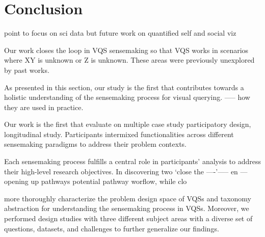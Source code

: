 \section{Conclusion\label{sec:conclusion}}
point to focus on sci data but future work on quantified self and social viz


Our work closes the loop in VQS sensemaking so that VQS works in scenarios  where XY is unknown or Z is unknown. These areas were previously unexplored by past works.

As presented in this section, our study is the first that contributes towards a holistic understanding of the sensemaking process for visual querying.
----- how they are used in practice. %

Our work is the first that evaluate on multiple case study participatory design, longitudinal study. 
Participants intermixed functionalities across different sensemaking paradigms to address their problem contexts.


Each sensemaking process fulfills a central role in participants' analysis to address their high-level research objectives. In discovering two `close the ----'----- en ---opening up pathways  potential pathway worflow, while clo

 more thoroughly characterize the problem design space of VQSs and taxonomy abstraction for understanding the sensemaking process in VQSs. Moreover, we performed design studies with three different subject areas with a diverse set of questions, datasets, and challenges to further generalize our findings.